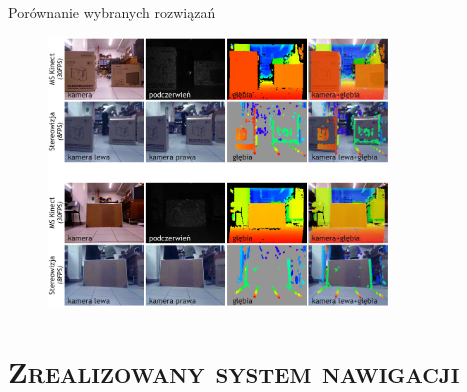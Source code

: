 \documentclass[xcolor=x11names,compress]{beamer}
\renewcommand{\(}{\begin{columns}}
\renewcommand{\)}{\end{columns}}
\newcommand{\<}[1]{\begin{column}{#1}}
\renewcommand{\>}{\end{column}}
\begin{document}
\begin{frame}{Porównanie wybranych rozwiązań}

\begin{figure}[h!]
\centering
\includegraphics[width=9cm]{../Common/img/compare}
\end{figure}

\end{frame}

\section{\scshape Zrealizowany system nawigacji}
\end{document}
